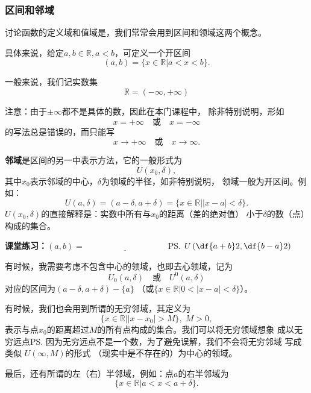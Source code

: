 \subsubsection*{区间和邻域}

讨论函数的定义域和值域是，我们常常会用到区间和领域这两个概念。

具体来说，给定$a,b\in\mathbb{R},a<b$，可定义一个开区间
$$(a,b)=\{x\in\mathbb{R}|a<x<b\}.$$

一般来说，我们记实数集
$$\mathbb{R}=(-\infty,+\infty)$$

{\baa 注意：由于$\pm\infty$都不是具体的数，因此在本门课程中，
除非特别说明，形如
$$x=+\infty\quad\mbox{或}\quad x=-\infty$$
的写法总是错误的，而只能写
$$x\to+\infty\quad\mbox{或}\quad x\to\infty.$$
}

{\bf 邻域}是区间的另一中表示方法，它的一般形式为
$$U(x_0,\delta),$$
其中$x_0$表示邻域的中心，$\delta$为领域的半径，如非特别说明，
领域一般为开区间。例如：
$$U(a,\delta)=(a-\delta,a+\delta)=\{x\in\mathbb{R}||x-a|<\delta\}.$$
$U(x_0,\delta)$的直接解释是：实数中所有与$x_0$的距离（差的绝对值）
小于$\delta$的数（点）构成的集合。

\bs

{\bf 课堂练习：}$(a,b)=\underline{\hspace{4cm}}$
\ifhint\ps{$U\left(\df{a+b}2,\df{b-a}2\right)$}\fi

\bs

有时候，我需要考虑不包含中心的领域，也即{\kaishu 去心领域}，记为
$$
U_0(a,\delta)\quad\mbox{或}\quad U^0(a,\delta)$$
对应的区间为$(a-\delta,a+\delta)-\{a\}$
（或$\{x\in\mathbb{R}|0<|x-a|<\delta\}$）。

有时候，我们也会用到所谓的{\kaishu 无穷邻域}，其定义为
$$\{x\in\mathbb{R}||x-x_0|>M\},\;M>0,$$
表示与点$x_0$的距离超过$M$的所有点构成的集合。我们可以将无穷领域想象
成以{\kaishu 无穷远点}\ps{\baa 因为无穷远点不是一个数，为了避免误解，我们不会将无穷邻域
写成类似 $U(\infty ,M)$的形式}
（现实中是不存在的）为中心的领域。

最后，还有所谓的{\kaishu 左（右）半邻域}，例如：点$a$的右半邻域为
$$\{x\in\mathbb{R}|a<x<a+\delta\}.$$

